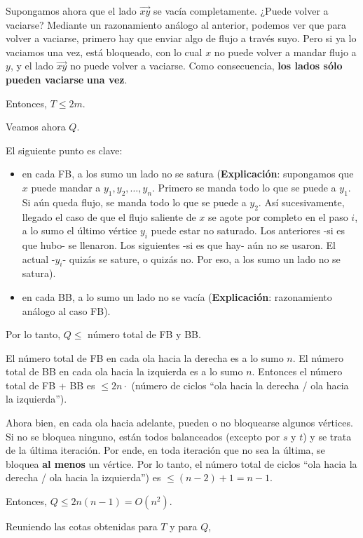 \documentclass[10pt,a4paper]{article}
\begin{document}
Supongamos ahora que el lado $\overrightarrow{xy}$ se vacía completamente. ¿Puede volver a vaciarse? Mediante un razonamiento análogo al anterior, podemos ver que para volver a vaciarse, primero hay que enviar algo de flujo a través suyo. Pero si ya lo vaciamos una vez, está bloqueado, con lo cual $x$ no puede volver a mandar flujo a $y$, y el lado $\overrightarrow{xy}$ no puede volver a vaciarse. Como consecuencia, \textbf{los lados sólo pueden vaciarse} \textbf{una vez}.

Entonces, $T \leq 2m$.

Veamos ahora $Q$.

El siguiente punto es clave:

\begin{itemize}

	\item en cada FB, a los sumo un lado no se satura (\textbf{Explicación}: supongamos que $x$ puede mandar a $y_1, y_2, \dots, y_n$. Primero se manda todo lo que se puede a $y_1$. Si aún queda flujo, se manda todo lo que se puede a $y_2$. Así sucesivamente, llegado el caso de que el flujo saliente de $x$ se agote por completo en el paso $i$, a lo sumo el último vértice $y_i$ puede estar no saturado. Los anteriores -si es que hubo- se llenaron. Los siguientes -si es que hay- aún no se usaron. El actual -$y_i$- quizás se sature, o quizás no. Por eso, a los sumo un lado no se satura).
	\item en cada BB, a lo sumo un lado no se vacía (\textbf{Explicación}: razonamiento análogo al caso FB).
\end{itemize}

Por lo tanto, $Q \leq $ número total de FB y BB.

El número total de FB en cada ola hacia la derecha es a lo sumo $n$. El número total de BB en cada ola hacia la izquierda es a lo sumo $n$. Entonces el número total de FB + BB es $\leq 2n \cdot$ (número de ciclos ``ola hacia la derecha / ola hacia la izquierda'').

Ahora bien, en cada ola hacia adelante, pueden o no bloquearse algunos vértices. Si no se bloquea ninguno, están todos balanceados (excepto por $s$ y $t$) y se trata de la última iteración. Por ende, en toda iteración que no sea la última, se bloquea \textbf{al menos} un vértice. Por lo tanto, el número total de ciclos ``ola hacia la derecha / ola hacia la izquierda'') es $\leq (n-2) + 1 = n - 1$.

Entonces, $Q \leq 2n(n-1) = O (n^2)$.

Reuniendo las cotas obtenidas para $T$ y para $Q$,
\end{document}
